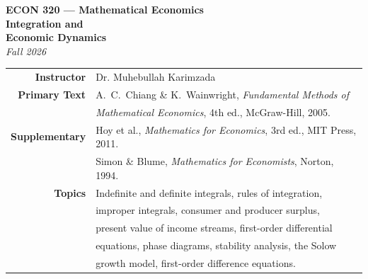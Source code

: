 \documentclass[12pt, a4paper]{article}
\theoremstyle{definition}
\begin{document}

\thispagestyle{empty}

\vspace*{-1.7cm}
\begin{center}
  {\color{white}\large\bfseries\sffamily ECON 320 --- Mathematical Economics}\\[10pt]
  {\color{white}\Huge\bfseries Integration and}\\[6pt]
  {\color{white}\Huge\bfseries Economic Dynamics}\\[10pt]
  {\color{amber}\Large\itshape
Fall 2026}
\end{center}

\vspace{3.8cm}
\begin{center}
\begin{tabular}{r l}
  \textbf{\textcolor{dkblue}{Instructor}}
    & Dr. Muhebullah Karimzada \\[3pt]
  \textbf{\textcolor{dkblue}{Primary Text}}
    & A.\ C.\ Chiang \& K.\ Wainwright, \textit{Fundamental Methods of}\\
    & \textit{Mathematical Economics}, 4th ed., McGraw-Hill, 2005.\\[3pt]
  \textbf{\textcolor{dkblue}{Supplementary}}
    & Hoy et al., \textit{Mathematics for Economics}, 3rd ed., MIT Press, 2011.\\[2pt]
    & Simon \& Blume, \textit{Mathematics for Economists}, Norton, 1994.\\[3pt]
  \textbf{\textcolor{dkblue}{Topics}}
    & Indefinite and definite integrals, rules of integration,\\
    & improper integrals, consumer and producer surplus,\\
    & present value of income streams, first-order differential\\
    & equations, phase diagrams, stability analysis, the Solow\\
    & growth model, first-order difference equations.\\
\end{tabular}
\end{center}
\end{document}
